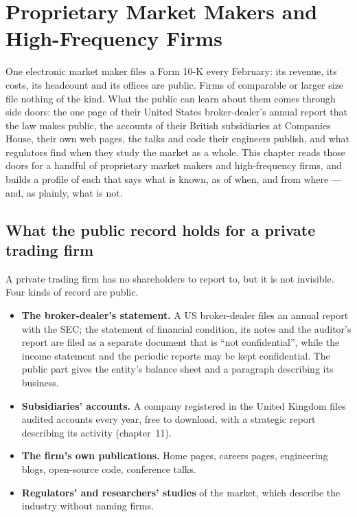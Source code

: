 \chapter{Proprietary Market Makers and High-Frequency Firms}\label{ch:in:proprietary-market-makers-and-high-frequency-firms}

One electronic market maker files a Form 10-K every February: its revenue, its costs, its headcount and its offices are
public. Firms of comparable or larger size file nothing of the kind. What the public can learn about them comes through
side doors: the one page of their United States broker-dealer's annual report that the law makes public, the accounts
of their British subsidiaries at Companies House, their own web pages, the talks and code their engineers publish, and
what regulators find when they study the market as a whole. This chapter reads those doors for a handful of
proprietary market makers and high-frequency firms, and builds a profile of each that says what is known, as of when,
and from where --- and, as plainly, what is not.

\section{What the public record holds for a private trading firm}

A private trading firm has no shareholders to report to, but it is not invisible. Four kinds of record are public.
\begin{itemize}
\item \textbf{The broker-dealer's statement.} A US broker-dealer files an annual report with the SEC; the statement of
financial condition, its notes and the auditor's report are filed as a separate document that is ``not confidential'',
while the income statement and the periodic reports may be kept confidential. The public part gives the entity's
balance sheet and a paragraph describing its business.
\item \textbf{Subsidiaries' accounts.} A company registered in the United Kingdom files audited accounts every year,
free to download, with a strategic report describing its activity (chapter~11).
\item \textbf{The firm's own publications.} Home pages, careers pages, engineering blogs, open-source code, conference
talks.
\item \textbf{Regulators' and researchers' studies} of the market, which describe the industry without naming firms.
\end{itemize}

